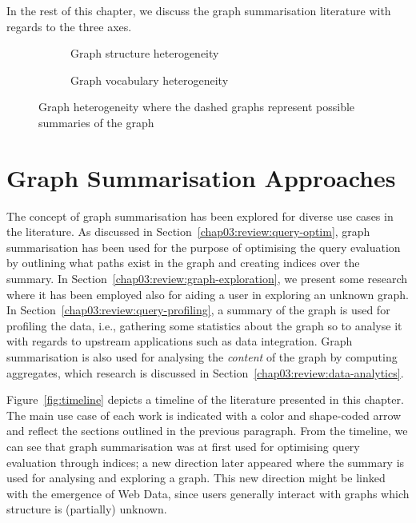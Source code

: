 In the rest of this chapter, we discuss the graph summarisation literature with regards to the three axes.

\begin{figure}
	\centering
	\begin{subfigure}{.5\textwidth}
		\resizebox{\textwidth}{!}{
			
		}
		\caption{Graph structure heterogeneity}
		\label{fig:hetero-struct}
	\end{subfigure}
	\qquad
	\begin{subfigure}{.42\textwidth}
		\resizebox{\textwidth}{!}{
			
		}
		\caption{Graph vocabulary heterogeneity}
		\label{fig:hetero-voc}
	\end{subfigure}
	\caption{Graph heterogeneity where the dashed graphs represent possible summaries of the graph}
	\label{fig:graph-hetero}
\end{figure}

\section{Graph Summarisation Approaches}

The concept of graph summarisation has been explored for diverse use cases in the literature. As discussed in Section~\ref{chap03:review:query-optim}, graph summarisation has been used for the purpose of optimising the query evaluation by outlining what paths exist in the graph and creating indices over the summary. In Section~\ref{chap03:review:graph-exploration}, we present some research where it has been employed also for aiding a user in exploring an unknown graph. In Section~\ref{chap03:review:query-profiling}, a summary of the graph is used for profiling the data, i.e., gathering some statistics about the graph so to analyse it with regards to upstream applications such as data integration. Graph summarisation is also used for analysing the \emph{content} of the graph by computing aggregates, which research is discussed in Section~\ref{chap03:review:data-analytics}.

Figure~\ref{fig:timeline} depicts a timeline of the literature presented in this chapter. The main use case of each work is indicated with a color and shape-coded arrow and reflect the sections outlined in the previous paragraph. From the timeline, we can see that graph summarisation was at first used for optimising query evaluation through indices; a new direction later appeared where the summary is used for analysing and exploring a graph. This new direction might be linked with the emergence of Web Data, since users generally interact with graphs which structure is (partially) unknown.


